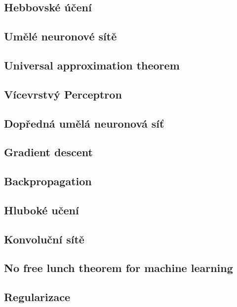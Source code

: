 \subsection{Hebbovské účení}
\subsection{Umělé neuronové sítě}
\subsection{Universal approximation theorem}
\label{sec:universal_approximation_theorem}

\subsection{Vícevrstvý Perceptron}
\label{sec:multilayer_perceptron}

\subsection{Dopředná umělá neuronová síť}
\label{sec:feedforward_nn}
\subsection{Gradient descent}
\label{sec:gradient_descent}
\subsection{Backpropagation}
\subsection{Hluboké učení}
\label{sec:deep_learning}
\subsection{Konvoluční sítě}
\label{sec:cnn}

\subsection{No free lunch theorem for machine learning}
\cite{Goodfellow2016}
\subsection{Regularizace}


